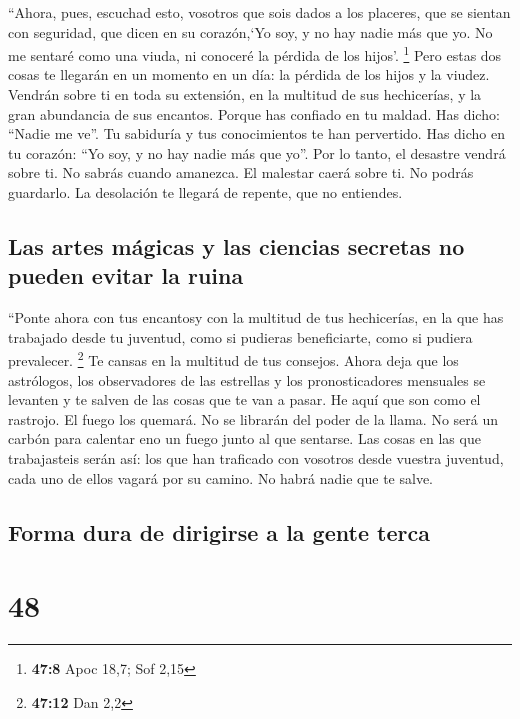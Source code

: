  ``Ahora, pues, escuchad esto, vosotros que sois dados a
los placeres, que se sientan con seguridad, que dicen en su corazón,`Yo
soy, y no hay nadie más que yo. No me sentaré como una viuda, ni
conoceré la pérdida de los hijos'. \footnote{\textbf{47:8} Apoc 18,7;
  Sof 2,15}  Pero estas dos cosas te llegarán en un
momento en un día: la pérdida de los hijos y la viudez. Vendrán sobre ti
en toda su extensión, en la multitud de sus hechicerías, y la gran
abundancia de sus encantos.  Porque has confiado en tu
maldad. Has dicho: ``Nadie me ve''. Tu sabiduría y tus conocimientos te
han pervertido. Has dicho en tu corazón: ``Yo soy, y no hay nadie más
que yo''.  Por lo tanto, el desastre vendrá sobre ti. No
sabrás cuando amanezca. El malestar caerá sobre ti. No podrás guardarlo.
La desolación te llegará de repente, que no entiendes.

\hypertarget{las-artes-muxe1gicas-y-las-ciencias-secretas-no-pueden-evitar-la-ruina}{%
\subsection{Las artes mágicas y las ciencias secretas no pueden evitar
la
ruina}\label{las-artes-muxe1gicas-y-las-ciencias-secretas-no-pueden-evitar-la-ruina}}

 ``Ponte ahora con tus encantosy con la multitud de tus
hechicerías, en la que has trabajado desde tu juventud, como si pudieras
beneficiarte, como si pudiera prevalecer. \footnote{\textbf{47:12} Dan
  2,2}  Te cansas en la multitud de tus consejos. Ahora
deja que los astrólogos, los observadores de las estrellas y los
pronosticadores mensuales se levanten y te salven de las cosas que te
van a pasar.  He aquí que son como el rastrojo. El fuego
los quemará. No se librarán del poder de la llama. No será un carbón
para calentar eno un fuego junto al que sentarse.  Las
cosas en las que trabajasteis serán así: los que han traficado con
vosotros desde vuestra juventud, cada uno de ellos vagará por su camino.
No habrá nadie que te salve.

\hypertarget{forma-dura-de-dirigirse-a-la-gente-terca}{%
\subsection{Forma dura de dirigirse a la gente
terca}\label{forma-dura-de-dirigirse-a-la-gente-terca}}

\hypertarget{section-47}{%
\section{48}\label{section-47}}

